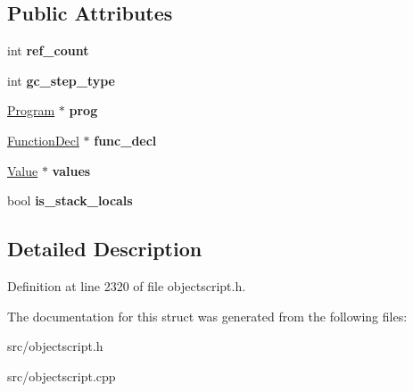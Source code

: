 \subsection*{Public Attributes}
\begin{DoxyCompactItemize}
\item 
int {\bfseries ref\+\_\+count}\hypertarget{struct_object_script_1_1_o_s_1_1_core_1_1_locals_a8d19577e6699e443fcf2a36ff0134530}{}\label{struct_object_script_1_1_o_s_1_1_core_1_1_locals_a8d19577e6699e443fcf2a36ff0134530}

\item 
int {\bfseries gc\+\_\+step\+\_\+type}\hypertarget{struct_object_script_1_1_o_s_1_1_core_1_1_locals_a5f3ac035d603a3e535d5a73cbb0e6bab}{}\label{struct_object_script_1_1_o_s_1_1_core_1_1_locals_a5f3ac035d603a3e535d5a73cbb0e6bab}

\item 
\hyperlink{class_object_script_1_1_o_s_1_1_core_1_1_program}{Program} $\ast$ {\bfseries prog}\hypertarget{struct_object_script_1_1_o_s_1_1_core_1_1_locals_a7a7b59fc1c502e842b7600c27ad58482}{}\label{struct_object_script_1_1_o_s_1_1_core_1_1_locals_a7a7b59fc1c502e842b7600c27ad58482}

\item 
\hyperlink{struct_object_script_1_1_o_s_1_1_core_1_1_function_decl}{Function\+Decl} $\ast$ {\bfseries func\+\_\+decl}\hypertarget{struct_object_script_1_1_o_s_1_1_core_1_1_locals_ac93f1e6a5a2204cff1d2ff8f4183d873}{}\label{struct_object_script_1_1_o_s_1_1_core_1_1_locals_ac93f1e6a5a2204cff1d2ff8f4183d873}

\item 
\hyperlink{struct_object_script_1_1_o_s_1_1_core_1_1_value}{Value} $\ast$ {\bfseries values}\hypertarget{struct_object_script_1_1_o_s_1_1_core_1_1_locals_a0acd5979cc37052472eb6ee006ff42a5}{}\label{struct_object_script_1_1_o_s_1_1_core_1_1_locals_a0acd5979cc37052472eb6ee006ff42a5}

\item 
bool {\bfseries is\+\_\+stack\+\_\+locals}\hypertarget{struct_object_script_1_1_o_s_1_1_core_1_1_locals_ab1bfc3231e44a88a546f1d96d7c98dce}{}\label{struct_object_script_1_1_o_s_1_1_core_1_1_locals_ab1bfc3231e44a88a546f1d96d7c98dce}

\end{DoxyCompactItemize}


\subsection{Detailed Description}


Definition at line 2320 of file objectscript.\+h.



The documentation for this struct was generated from the following files\+:\begin{DoxyCompactItemize}
\item 
src/objectscript.\+h\item 
src/objectscript.\+cpp\end{DoxyCompactItemize}
